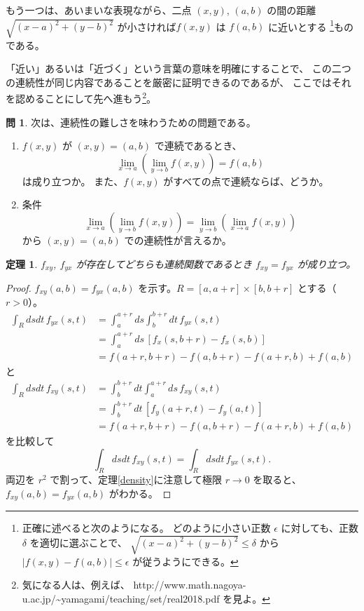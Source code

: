 \documentclass[a4paper]{jsarticle}
\newtheorem{Theorem}{定理}[section]
\theoremstyle{definition}
\newtheorem{Exercise}{問}%
\theoremstyle{remark}
\begin{document}
もう一つは、あいまいな表現ながら、二点 $(x,y)$, $(a,b)$ の間の距離 
$\sqrt{(x-a)^2 + (y-b)^2}$ が小さければ$f(x,y)$ は $f(a,b)$ に近いとする
\footnote{正確に述べると次のようになる。
どのように小さい正数 $\epsilon$ に対しても、正数 $\delta$ を適切に選ぶことで、
$\sqrt{(x-a)^2 + (y-b)^2} \leq \delta$ から 
$|f(x,y) - f(a,b)| \leq \epsilon$ が従うようにできる。}ものである。

「近い」あるいは「近づく」という言葉の意味を明確にすることで、
この二つの連続性が同じ内容であることを厳密に証明できるのであるが、
ここではそれを認めることにして先へ進もう\footnote{
気になる人は、例えば、 http://www.math.nagoya-u.ac.jp/\~{}yamagami/teaching/set/real2018.pdf を見よ。
}。

\begin{Exercise}
次は、連続性の難しさを味わうための問題である。
\begin{enumerate}
\item
$f(x,y)$ が $(x,y) = (a,b)$ で連続であるとき、
\[
\lim_{x\to a} \left( \lim_{y\to b} f(x,y) \right) = f(a,b)
\]
は成り立つか。
また、$f(x,y)$ がすべての点で連続ならば、どうか。
\item
条件
\[
\lim_{x\to a} \left( \lim_{y\to b} f(x,y) \right) = 
\lim_{y\to b} \left( \lim_{x\to a} f(x,y) \right)  
\]
から $(x,y) = (a,b)$ での連続性が言えるか。
\end{enumerate}
\end{Exercise} 

\begin{Theorem} $f_{xy}$, $f_{yx}$ が存在してどちらも連続関数であるとき
$f_{xy} = f_{yx}$ が成り立つ。
\end{Theorem}
\medskip
\begin{proof} 
$f_{xy}(a,b) = f_{yx}(a,b)$ を示す。$R = [a,a+r]\times [b,b+r]$
とする（$r>0$）。
\begin{align*}
\int_R dsdt\,f_{yx}(s,t) 
&= \int_a^{a+r}ds \int_b^{b+r} dt\, f_{yx}(s,t)\\
&= \int_a^{a+r}ds\, [f_x(s,b+r) - f_x(s,b)]\\
&= f(a+r,b+r) - f(a,b+r) - f(a+r,b) + f(a,b)
\end{align*}
と
\begin{align*}
\int_R dsdt\,f_{xy}(s,t) 
&= \int_b^{b+r}dt \int_a^{a+r} ds\, f_{xy}(s,t)\\
&= \int_b^{b+r}dt\, [f_y(a+r,t) - f_y(a,t)]\\
&= f(a+r,b+r) - f(a,b+r) - f(a+r,b) + f(a,b)
\end{align*}
を比較して
\[
\int_R dsdt\,f_{xy}(s,t) = \int_R dsdt\,f_{yx}(s,t).
\]
両辺を $r^2$ で割って、定理\ref{density}に注意して極限 $r \to 0$ を取ると、
$f_{xy}(a,b) = f_{yx}(a,b)$ がわかる。
\end{proof}
\end{document}

